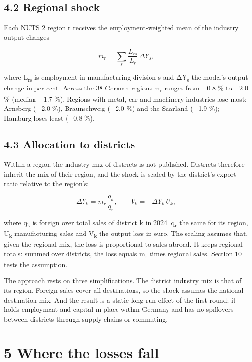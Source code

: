 \documentclass[
  11pt,
]{article}
\begin{document}
\hypertarget{regional-shock}{%
\subsection{4.2 Regional shock}\label{regional-shock}}

Each NUTS 2 region r receives the employment-weighted mean of the
industry output changes,

\[ m_r = \sum_s \frac{L_{rs}}{L_r}\,\Delta Y_s , \]

where L\textsubscript{rs} is employment in manufacturing division s and
ΔY\textsubscript{s} the model's output change in per cent. Across the 38
German regions m\textsubscript{r} ranges from −0.8 \% to −2.0 \% (median
−1.7 \%). Regions with metal, car and machinery industries lose most:
Arnsberg (−2.0 \%), Braunschweig (−2.0 \%) and the Saarland (−1.9 \%);
Hamburg loses least (−0.8 \%).

\hypertarget{allocation-to-districts}{%
\subsection{4.3 Allocation to districts}\label{allocation-to-districts}}

Within a region the industry mix of districts is not published.
Districts therefore inherit the mix of their region, and the shock is
scaled by the district's export ratio relative to the region's:

\[ \Delta Y_k = m_r \, \frac{q_k}{q_r}, \qquad V_k = -\Delta Y_k \, U_k , \]

where q\textsubscript{k} is foreign over total sales of district k in
2024, q\textsubscript{r} the same for its region, U\textsubscript{k}
manufacturing sales and V\textsubscript{k} the output loss in euro. The
scaling assumes that, given the regional mix, the loss is proportional
to sales abroad. It keeps regional totals: summed over districts, the
loss equals m\textsubscript{r} times regional sales. Section 10 tests
the assumption.

The approach rests on three simplifications. The district industry mix
is that of its region. Foreign sales cover all destinations, so the
shock assumes the national destination mix. And the result is a static
long-run effect of the first round: it holds employment and capital in
place within Germany and has no spillovers between districts through
supply chains or commuting.

\hypertarget{where-the-losses-fall}{%
\section{5 Where the losses fall}\label{where-the-losses-fall}}
\end{document}
